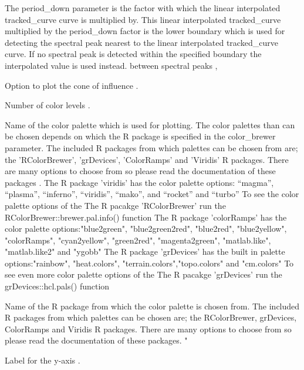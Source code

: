 \documentclass[a4paper]{book}
\begin{document}
\begin{Arguments}
\begin{ldescription}
\item[\code{period\_down}] The period\_down parameter is the factor with which the linear interpolated tracked\_curve
curve is multiplied by. This linear interpolated tracked\_curve multiplied by the period\_down factor is
the lower boundary which is used  for detecting the spectral peak nearest to the linear interpolated tracked\_curve
curve. If no spectral peak is detected within the specified boundary the interpolated
value is used instead. between spectral peaks ,

\item[\code{plot.COI}] Option to plot the cone of influence .

\item[\code{n.levels}] Number of color levels .

\item[\code{palette\_name}] Name of the color palette which is used for plotting.
The color palettes than can be chosen depends on which the R package is specified in
the color\_brewer parameter. The included R packages from which palettes can be chosen
from are; the 'RColorBrewer', 'grDevices', 'ColorRamps' and 'Viridis' R packages.
There are many options to choose from so please
read the documentation of these packages .
The R package 'viridis' has the color palette options: “magma”, “plasma”,
“inferno”, “viridis”, “mako”, and “rocket”  and “turbo”
To see the color palette options of the The R pacakge 'RColorBrewer' run
the RColorBrewer::brewer.pal.info() function
The R package 'colorRamps' has the color palette options:"blue2green",
"blue2green2red", "blue2red",    "blue2yellow", "colorRamps",    "cyan2yellow",
"green2red", "magenta2green", "matlab.like", "matlab.like2" and    "ygobb"
The R package 'grDevices' has the built in  palette options:"rainbow",
"heat.colors", "terrain.colors","topo.colors" and "cm.colors"
To see even more color palette options of the The R pacakge 'grDevices' run
the grDevices::hcl.pals() function

\item[\code{color\_brewer}] Name of the R package from which the color palette is chosen from.
The included R packages from which palettes can be chosen
are; the RColorBrewer, grDevices, ColorRamps and Viridis R packages.
There are many options to choose from so please
read the documentation of these packages. "

\item[\code{periodlab}] Label for the y-axis .


\end{ldescription}
\end{Arguments}
\end{document}
